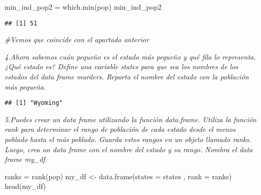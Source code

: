 \documentclass[
]{article}
\newenvironment{Shaded}{\begin{snugshade}}{\end{snugshade}}
\newcommand{\AttributeTok}[1]{\textcolor[rgb]{0.77,0.63,0.00}{#1}}
\newcommand{\CommentTok}[1]{\textcolor[rgb]{0.56,0.35,0.01}{\textit{#1}}}
\newcommand{\FunctionTok}[1]{\textcolor[rgb]{0.00,0.00,0.00}{#1}}
\newcommand{\NormalTok}[1]{#1}
\newcommand{\OtherTok}[1]{\textcolor[rgb]{0.56,0.35,0.01}{#1}}
\newcommand{\SpecialCharTok}[1]{\textcolor[rgb]{0.00,0.00,0.00}{#1}}
\begin{document}
\begin{Shaded}
\begin{Highlighting}[]
\NormalTok{min\_ind\_pop2 }\OtherTok{=} \FunctionTok{which.min}\NormalTok{(pop)}
\NormalTok{min\_ind\_pop2}
\end{Highlighting}
\end{Shaded}

\begin{verbatim}
## [1] 51
\end{verbatim}

\begin{Shaded}
\begin{Highlighting}[]
\CommentTok{\#Vemos que coincide con el apartado anterior}
\end{Highlighting}
\end{Shaded}

\emph{4.Ahora sabemos cuán pequeño es el estado más pequeño y qué fila
lo representa. ¿Qué estado es? Define una variable states para que sea
los nombres de los estados del data frame murders. Reporta el nombre del
estado con la población más pequeña.}

\begin{Shaded}
\end{Shaded}

\begin{verbatim}
## [1] "Wyoming"
\end{verbatim}

\begin{Shaded}
\end{Shaded}

\emph{5.Puedes crear un data frame utilizando la función data.frame.
Utiliza la función rank para determinar el rango de población de cada
estado desde el menos poblado hasta el más poblado. Guarda estos rangos
en un objeto llamado ranks. Luego, crea un data frame con el nombre del
estado y su rango. Nombra el data frame my\_df.}

\begin{Shaded}
\begin{Highlighting}[]
\NormalTok{ranks }\OtherTok{=} \FunctionTok{rank}\NormalTok{(pop)}
\NormalTok{my\_df }\OtherTok{\textless{}{-}} \FunctionTok{data.frame}\NormalTok{(}\AttributeTok{states =}\NormalTok{ states , }\AttributeTok{rank =}\NormalTok{ ranks)}
\FunctionTok{head}\NormalTok{(my\_df)}
\end{Highlighting}
\end{Shaded}
\end{document}
